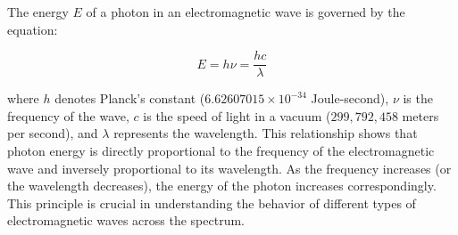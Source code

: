 \documentclass[
  12 pt,
]{Nemilov}
\begin{document}
\begin{table}[!h]
\centering
\caption{\label{tab:emspectrum}Wavelength, frequency, and energy in the electromagnetic spectrum}
\centering
{}
\end{table}

The energy \(E\) of a photon in an electromagnetic wave is governed by the equation:

\[E = h \nu = \frac{h c}{\lambda}\]

where \(h\) denotes Planck's constant (\(6.62607015 \times 10^{-34}\) Joule-second), \(\nu\) is the frequency of the wave, \(c\) is the speed of light in a vacuum (\(299,792,458\) meters per second), and \(\lambda\) represents the wavelength. This relationship shows that photon energy is directly proportional to the frequency of the electromagnetic wave and inversely proportional to its wavelength. As the frequency increases (or the wavelength decreases), the energy of the photon increases correspondingly. This principle is crucial in understanding the behavior of different types of electromagnetic waves across the spectrum.
\end{document}
